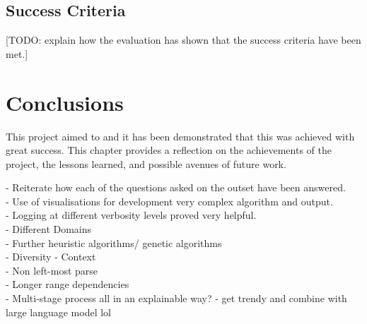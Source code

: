 \documentclass[12pt,a4paper,twoside,openany]{report} \usepackage[pdfborder={0 0 0}]{hyperref}    %
\theoremstyle{definition} \newtheorem{definition}{Definition}[section]
\begin{document}
\section{Success Criteria}
\label{sec:successCriteriaEval}

[TODO: explain how the evaluation has shown that the success criteria have been met.]


      \chapter{Conclusions} 
      This project aimed to  and it has been demonstrated that this was achieved with great success. 
      This chapter provides a reflection on the achievements of the project, the lessons learned, and possible avenues of future work.

      - Reiterate how each of the questions asked on the outset have been answered. \\
      - Use of visualisations for development very complex algorithm and output. \\
      - Logging at different verbosity levels proved very helpful. \\
      - Different Domains \\
      - Further heuristic algorithms/ genetic algorithms \\
      - Diversity
      - Context \\
      - Non left-most parse \\
      - Longer range dependencies \\
      - Multi-stage process all in an explainable way? - get trendy and combine with large language model lol


      \nocite{ * }

      



      \appendix
\end{document}
